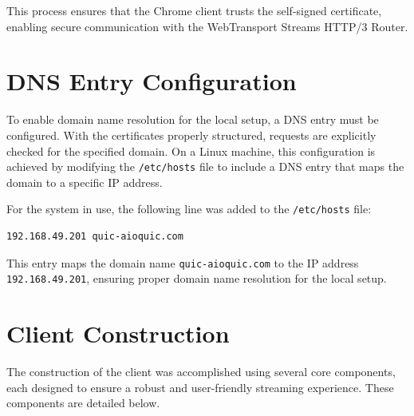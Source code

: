 This process ensures that the Chrome client trusts the self-signed certificate, enabling secure communication with the WebTransport Streams HTTP/3 Router.





\section{DNS Entry Configuration}
To enable domain name resolution for the local setup, a DNS entry must be configured. With the certificates properly structured, requests are explicitly checked for the specified domain. On a Linux machine, this configuration is achieved by modifying the \texttt{/etc/hosts} file to include a DNS entry that maps the domain to a specific IP address.

For the system in use, the following line was added to the \texttt{/etc/hosts} file:

\begin{lstlisting}
192.168.49.201 quic-aioquic.com
\end{lstlisting}

This entry maps the domain name \texttt{quic-aioquic.com} to the IP address \texttt{192.168.49.201}, ensuring proper domain name resolution for the local setup.




\section{Client Construction}
The construction of the client was accomplished using several core components, each designed to ensure a robust and user-friendly streaming experience. These components are detailed below.

